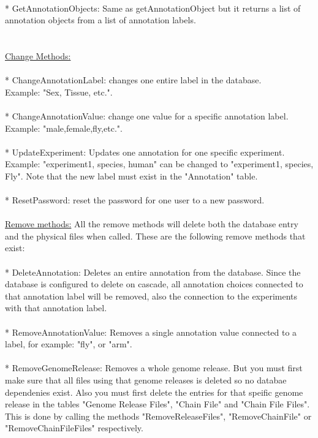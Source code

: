 \documentclass[a4paper]{report}
\begin{document}
\\
* GetAnnotationObjects: Same as getAnnotationObject but it returns a list of annotation objects from a list of annotation labels.\\
\\
\\
\underline{Change Methods:}\\
\\
* ChangeAnnotationLabel: changes one entire label in the database.\\Example: "Sex, Tissue, etc.".\\
\\
* ChangeAnnotationValue: change one value for a specific annotation label.\\Example: "male,female,fly,etc.".\\
\\
* UpdateExperiment: Updates one annotation for one specific experiment. Example: "experiment1, species, human" can be changed to "experiment1, species, Fly". Note that the new label must exist in the "Annotation" table.\\
\\
* ResetPassword: reset the password for one user to a new password. \\
\\
\underline{Remove methods:} All the remove methods will delete both the database entry and the physical files when called. These are the following remove methods that exist:\\
\\
* DeleteAnnotation: Deletes an entire annotation from the database. Since the database is configured to delete on cascade, all annotation choices connected to that annotation label will be removed, also the connection to the experiments with that annotation label.\\
\\
* RemoveAnnotationValue: Removes a single annotation value connected to a label, for example: "fly", or "arm".\\
\\
* RemoveGenomeRelease: Removes a whole genome release. But you must first make sure that all files using that genome releases is deleted so no databae dependenies exist. Also you must first delete the entries for that speific genome release in the tables "Genome Release Files", "Chain File" and "Chain File Files". This is done by calling the methods "RemoveReleaseFiles", "RemoveChainFile" or "RemoveChainFileFiles" respectively. \\
\end{document}
